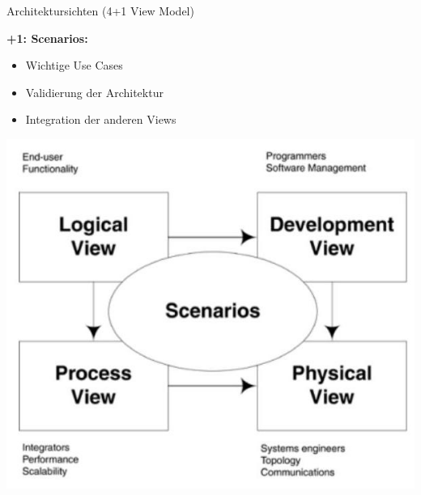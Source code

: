 \begin{concept}{Architektursichten (4+1 View Model)}
    
\textbf{+1: Scenarios:}
    \begin{itemize}
        \item Wichtige Use Cases
        \item Validierung der Architektur
        \item Integration der anderen Views
    \end{itemize}
\includegraphics[width=0.9\linewidth]{images/2024_12_29_0d1d7b5551ea1b4b41bdg-09}
\end{concept}

